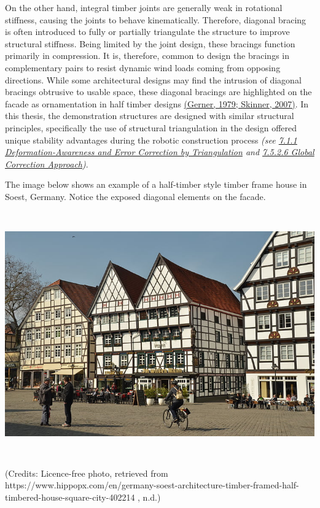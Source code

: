 \documentclass[11pt]{book}
\begin{document}
On the other hand, integral timber joints are generally weak in rotational stiffness, causing the joints to behave kinematically. Therefore, diagonal bracing is often introduced to fully or partially triangulate the structure to improve structural stiffness. Being limited by the joint design, these bracings function primarily in compression. It is, therefore, common to design the bracings in complementary pairs to resist dynamic wind loads coming from opposing directions. While some architectural designs may find the intrusion of diagonal bracings obtrusive to usable space, these diagonal bracings are highlighted on the facade as ornamentation in half timber designs \href{https://www.zotero.org/google-docs/?NgmBHM}{(Gerner, 1979; Skinner, 2007)}. In this thesis, the demonstration structures are designed with similar structural principles, specifically the use of structural triangulation in the design offered unique stability advantages during the robotic construction process \textit{(see \uline{7.1.1 Deformation-Awareness and Error Correction by Triangulation} and \uline{7.5.2.6 Global Correction Approach})}.

The image below shows an example of a half-timber style timber frame house in Soest, Germany. Notice the exposed diagonal elements on the facade.

\includegraphics[width=15.92cm,height=10.55cm]{./images/image9.jpg}{\footnotesize (Credits: Licence-free photo, retrieved from https://www.hippopx.com/en/germany-soest-architecture-timber-framed-half-timbered-house-square-city-402214 , n.d.)\par}
\end{document}
